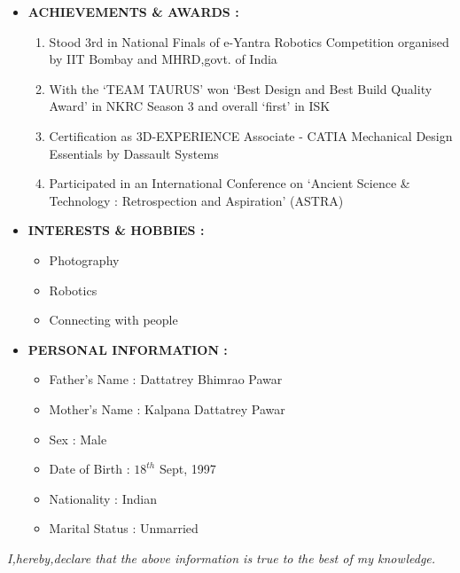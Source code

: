\documentclass[11pt]{article}
\begin{document}
\begin{itemize}[label=$\star$]
\newpage
\item	\begin{large} \textbf{ACHIEVEMENTS \& AWARDS :} \end{large}
\begin{enumerate}
	\item Stood 3rd in National Finals of e-Yantra Robotics Competition organised by IIT Bombay and 
	MHRD,govt. of India
	\item With the ‘TEAM TAURUS’ won ‘Best Design and Best Build Quality Award’ in NKRC Season 3 and overall ‘first’ in ISK 
	\item Certification as 3D-EXPERIENCE Associate - CATIA Mechanical Design Essentials by Dassault Systems
	\item Participated in an International Conference on ‘Ancient Science \& Technology : Retrospection and Aspiration’ (ASTRA)
\end{enumerate}

	\bigskip
\item	\begin{large} \textbf{INTERESTS \& HOBBIES :} \end{large}
\begin{itemize}[label=$\bullet$]
	\item Photography
	\item Robotics
	\item Connecting with people
\end{itemize}

	\bigskip
\item	\begin{large} \textbf{PERSONAL INFORMATION :} \end{large}
\begin{itemize}[label=$-$]
	\item	Father's Name  :  Dattatrey Bhimrao Pawar
	\item	Mother's Name  :  Kalpana Dattatrey Pawar
	\item	Sex            :  Male
	\item	Date of Birth  :  $18^{th}$ Sept, 1997
	\item   Nationality    :  Indian
	\item   Marital Status :  Unmarried
\end{itemize}
\end{itemize}

\bigskip
\begin{large}\textit{I,hereby,declare that the above information is true to the best of my knowledge.} \end{large}
\end{document}
